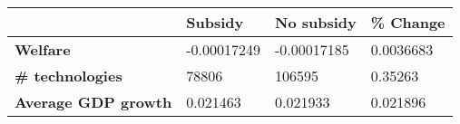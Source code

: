 \begin{tabular}{|l|l|l|l|}
\hline
&\textbf{Subsidy}&\textbf{No subsidy}&\textbf{\% Change}\\\hline
\textbf{Welfare}&-0.00017249&-0.00017185&0.0036683\\\hline
\textbf{\# technologies}&78806&106595&0.35263\\\hline
\textbf{Average GDP growth}&0.021463&0.021933&0.021896\\\hline
\end{tabular}
